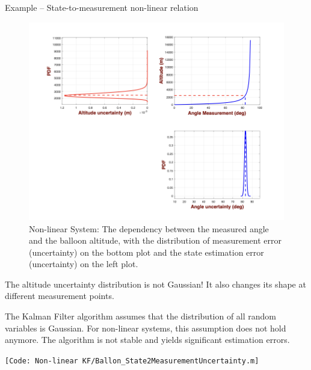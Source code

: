 \begin{frame}{Example – State-to-measurement non-linear relation}
\begin{figure}
    \centering
    \includegraphics[width=0.5\linewidth]{Figures//Background3/Ballon_NonLinearDynamics_Results.png}
    \vspace{-15pt}
    \caption{Non-linear System: The dependency between the measured angle and the balloon altitude, with the distribution of measurement error (uncertainty) on the bottom plot and the state estimation error (uncertainty) on the left plot.}
    \end{figure}
    The altitude uncertainty distribution is not Gaussian! It also changes its shape at different measurement points.
    
    The Kalman Filter algorithm assumes that the distribution of all random variables is Gaussian. For non-linear systems, this assumption does not hold anymore. The algorithm is not stable and yields significant estimation errors.

\texttt{\tiny [Code: Non-linear KF/Ballon\_State2MeasurementUncertainty.m]}

\end{frame}
